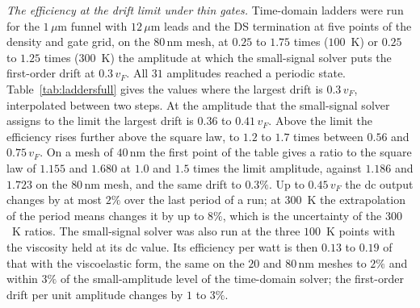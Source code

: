 \documentclass[aps,prapplied,onecolumn,superscriptaddress,floatfix]{revtex4-2}
\newcommand{\um}{\,\mu\mathrm{m}}
\newcommand{\nm}{\,\mathrm{nm}}
\begin{document}
\emph{The efficiency at the drift limit under thin gates.} Time-domain
ladders were run for the $1\um$ funnel with $12\um$ leads and the DS
termination at five points of the density and gate grid, on the $80\nm$
mesh, at $0.25$ to $1.75$ times ($100$~K) or $0.25$ to $1.25$ times
($300$~K) the amplitude at which the small-signal solver puts the
first-order drift at $0.3\,v_{F}$. All $31$ amplitudes reached a
periodic state. Table~\ref{tab:laddersfull} gives the values where the
largest drift is $0.3\,v_{F}$, interpolated between two steps. At the
amplitude that the small-signal solver assigns to the limit the largest
drift is $0.36$ to $0.41\,v_{F}$. Above the limit the efficiency rises
further above the square law, to $1.2$ to $1.7$ times between $0.56$ and
$0.75\,v_{F}$. On a mesh of $40\nm$ the first point of the table gives a
ratio to the square law of $1.155$ and $1.680$ at $1.0$ and $1.5$ times
the limit amplitude, against $1.186$ and $1.723$ on the $80\nm$ mesh,
and the same drift to $0.3\%$. Up to $0.45\,v_{F}$ the dc output changes
by at most $2\%$ over the last period of a run; at $300$~K the
extrapolation of the period means changes it by up to $8\%$, which is
the uncertainty of the $300$~K ratios. The small-signal solver was also
run at the three $100$~K points with the viscosity held at its dc
value. Its efficiency per watt is then $0.13$ to $0.19$ of that with the
viscoelastic form, the same on the $20$ and $80\nm$ meshes to $2\%$ and
within $3\%$ of the small-amplitude level of the time-domain solver; the
first-order drift per unit amplitude changes by $1$ to $3\%$.
\end{document}
